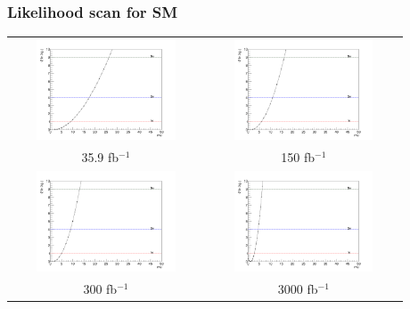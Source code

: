 \documentclass[11pt]{beamer}
\newcommand{\nologo}{\setbeamertemplate{logo}{}}
\begin{document}
{\nologo
	\begin{frame}
	\frametitle{Likelihood scan for SM }
	\begin{center}
		\begin{tabular}{cc}
			\includegraphics[width=5.5cm,height=3cm]{figures/Likelihood.png} &
			\includegraphics[width=5.5cm,height=3cm]{figures/150fb/Likelihood.png}\\ 
			\scriptsize{35.9 fb$^{-1}$} & \scriptsize{150 fb$^{-1}$} \\
			\includegraphics[width=5.5cm,height=3cm]{figures/300fb/Likelihood.png}&
			\includegraphics[width=5.5cm,height=3cm]{figures/3000fb/Likelihood.png}\\
			\scriptsize{300 fb$^{-1}$} & \scriptsize{3000 fb$^{-1}$} \\
		\end{tabular}
	\end{center}
\end{frame}
}
\end{document}

